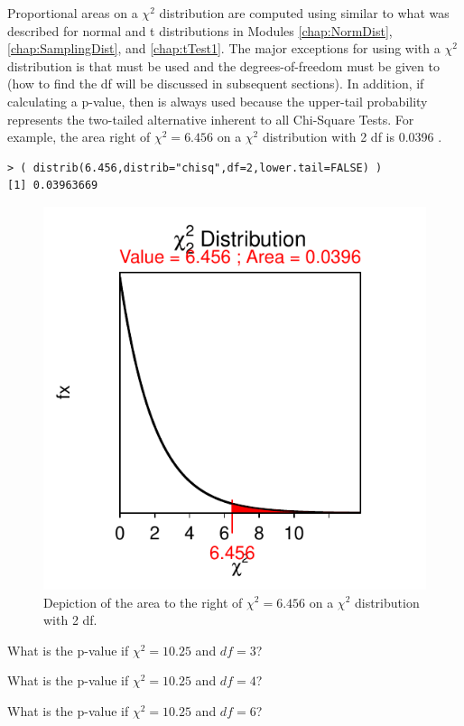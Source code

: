 \documentclass[10pt,openany]{book}\usepackage[]{graphicx}\usepackage[]{color}
\makeatletter
\newenvironment{kframe}{%
 \def\at@end@of@kframe{}%
 \ifinner\ifhmode%
  \def\at@end@of@kframe{\end{minipage}}%
  \begin{minipage}{\columnwidth}%
 \fi\fi%
 \def\FrameCommand##1{\hskip\@totalleftmargin \hskip-\fboxsep
 \colorbox{shadecolor}{##1}\hskip-\fboxsep
     \hskip-\linewidth \hskip-\@totalleftmargin \hskip\columnwidth}%
 \MakeFramed {\advance\hsize-\width
   \@totalleftmargin\z@ \linewidth\hsize
   \@setminipage}}%
 {\par\unskip\endMakeFramed%
 \at@end@of@kframe}
\newenvironment{knitrout}{}{} %
\makeatother
\begin{document}
Proportional areas on a $\chi^2$ distribution are computed using  similar to what was described for normal and t distributions in Modules \ref{chap:NormDist}, \ref{chap:SamplingDist}, and \ref{chap:tTest1}. The major exceptions for using  with a $\chi^2$ distribution is that  must be used and the degrees-of-freedom must be given to  (how to find the df will be discussed in subsequent sections). In addition, if calculating a p-value, then  is always used because the upper-tail probability represents the two-tailed alternative inherent to all Chi-Square Tests.  For example, the area right of $\chi^2=6.456$ on a $\chi^2$ distribution with 2 df is 0.0396 .
\begin{knitrout}
\color{fgcolor}\begin{kframe}
\begin{verbatim}
> ( distrib(6.456,distrib="chisq",df=2,lower.tail=FALSE) )
[1] 0.03963669
\end{verbatim}
\end{kframe}\begin{figure}[hbtp]

{\centering \includegraphics[width=.4\linewidth]{Figs/chiarea1-1} 

}

\caption[Depiction of the area to the right of $\chi^2=6.456$ on a $\chi^2$ distribution with 2 df]{Depiction of the area to the right of $\chi^2=6.456$ on a $\chi^2$ distribution with 2 df.}\label{fig:chiarea1}
\end{figure}


\end{knitrout}

\newpage
\begin{exsection}
\vspace{-3pt}
  \item \label{revex:ChiPVal1} What is the p-value if $\chi^{2}=10.25$ and $df=3$? 
  \item \label{revex:ChiPVal2} What is the p-value if $\chi^{2}=10.25$ and $df=4$? 
  \item \label{revex:ChiPVal3} What is the p-value if $\chi^{2}=10.25$ and $df=6$? 
\end{exsection}
\end{document}
